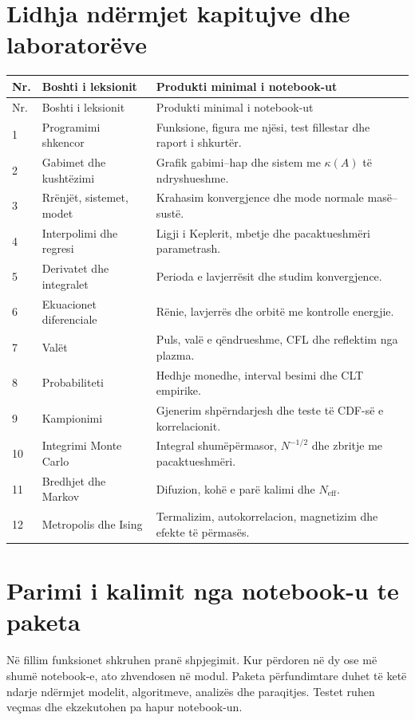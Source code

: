 \documentclass[11pt,oneside,openany]{book}
\begin{document}
\section{Lidhja ndërmjet kapitujve dhe laboratorëve}
\begin{longtable}{p{}p{}p{}}
\toprule
Nr. & Boshti i leksionit & Produkti minimal i notebook-ut\\ \midrule
\endfirsthead
\toprule Nr. & Boshti i leksionit & Produkti minimal i notebook-ut\\ \midrule\endhead
1 & Programimi shkencor & Funksione, figura me njësi, test fillestar dhe raport i shkurtër.\\
2 & Gabimet dhe kushtëzimi & Grafik gabimi--hap dhe sistem me $\kappa(A)$ të ndryshueshme.\\
3 & Rrënjët, sistemet, modet & Krahasim konvergjence dhe mode normale masë--sustë.\\
4 & Interpolimi dhe regresi & Ligji i Keplerit, mbetje dhe pacaktueshmëri parametrash.\\
5 & Derivatet dhe integralet & Perioda e lavjerrësit dhe studim konvergjence.\\
6 & Ekuacionet diferenciale & Rënie, lavjerrës dhe orbitë me kontrolle energjie.\\
7 & Valët & Puls, valë e qëndrueshme, CFL dhe reflektim nga plazma.\\
8 & Probabiliteti & Hedhje monedhe, interval besimi dhe CLT empirike.\\
9 & Kampionimi & Gjenerim shpërndarjesh dhe teste të CDF-së e korrelacionit.\\
10 & Integrimi Monte Carlo & Integral shumëpërmasor, $N^{-1/2}$ dhe zbritje me pacaktueshmëri.\\
11 & Bredhjet dhe Markov & Difuzion, kohë e parë kalimi dhe $N_{\mathrm{eff}}$.\\
12 & Metropolis dhe Ising & Termalizim, autokorrelacion, magnetizim dhe efekte të përmasës.\\
\bottomrule
\end{longtable}

\section{Parimi i kalimit nga notebook-u te paketa}
Në fillim funksionet shkruhen pranë shpjegimit. Kur përdoren në dy ose më shumë notebook-e, ato zhvendosen në modul. Paketa përfundimtare duhet të ketë ndarje ndërmjet modelit, algoritmeve, analizës dhe paraqitjes. Testet ruhen veçmas dhe ekzekutohen pa hapur notebook-un.
\end{document}
